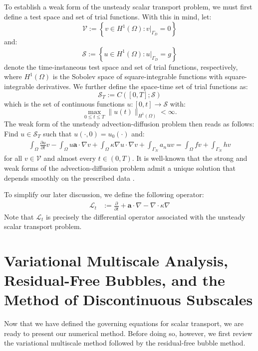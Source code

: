 \documentclass[11pt]{article}
\begin{document}
To establish a weak form of the unsteady scalar transport problem, we must first define a test space and set of trial functions.  With this in mind, let:
\begin{equation}
\mathcal{V} := \left\{ v \in H^1\left(\Omega\right): v|_{\Gamma_D} = 0 \right\}
\end{equation}
and:
\begin{equation}
\mathcal{S} := \left\{ u \in H^1\left(\Omega\right): u|_{\Gamma_D} = g \right\}
\end{equation}
denote the time-instaneous test space and set of trial functions, respectively, where $H^1\left(\Omega\right)$ is the Sobolev space of square-integrable functions with square-integrable derivatives.  We further define the space-time set of trial functions as:
\begin{equation}
\mathcal{S}_T := C([0,T];\mathcal{S})
\end{equation}
which is the set of continuous functions $u: [0,t] \rightarrow \mathcal{S}$ with:
$$\max_{0 \leq t \leq T} \| u(t) \|_{H^1(\Omega)} < \infty.$$
The weak form of the unsteady advection-diffusion problem then reads as follows: Find $u \in \mathcal{S}_T$ such that $u(\cdot,0) = u_0(\cdot)$ and:
\begin{equation}\label{eq:ad_weak}
\begin{aligned}
\int_\Omega \frac{\partial u}{\partial t} v -  \int_\Omega u \bm{a} \cdot \nabla v +  \int_\Omega \kappa \nabla u \cdot \nabla v + \int_{\Gamma_N} a_n u v = \int_\Omega f v + \int_{\Gamma_N} h v
\end{aligned}
\end{equation}
\noindent for all $v \in \mathcal{V}$ and almost every $t \in (0,T)$.  It is well-known that the strong and weak forms of the advection-diffusion problem admit a unique solution that depends smoothly on the prescribed data \cite{Evans10}.

To simplify our later discussion, we define the following operator:
\begin{equation}\label{eq:l_operators}
\begin{aligned}
\mathcal{L}_t & := \frac{\partial}{\partial t} + \bm{a} \cdot \nabla - \nabla \cdot \kappa \nabla
\end{aligned}
\end{equation}
Note that $\mathcal{L}_t$ is precisely the differential operator associated with the unsteady scalar transport problem.

\section{Variational Multiscale Analysis, Residual-Free Bubbles, and the Method of Discontinuous Subscales}
Now that we have defined the governing equations for scalar transport, we are ready to present our numerical method.  Before doing so, however, we first review the variational multiscale method followed by the residual-free bubble method.
\end{document}
